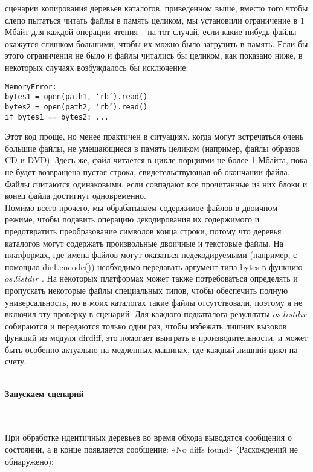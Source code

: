 \documentclass[12pt]{article}
\begin{document}
сценарии копирования деревьев каталогов, приведенном выше,
вместо того чтобы слепо пытаться читать файлы в память целиком, мы
установили ограничение в 1 Мбайт для каждой операции чтения – на
тот случай, если какие-нибудь файлы окажутся слишком большими,
чтобы их можно было загрузить в память. Если бы этого ограничения не было и файлы читались бы целиком, как
показано ниже, в некоторых случаях возбуждалось бы исключение:
\begin{verbatim}
MemoryError:
bytes1 = open(path1, ‘rb’).read()
bytes2 = open(path2, ‘rb’).read()
if bytes1 == bytes2: ...
\end{verbatim}
Этот код проще, но менее практичен в ситуациях, когда могут встречаться очень большие файлы, не умещающиеся в память целиком
(например, файлы образов CD и DVD). Здесь же, файл читается
в цикле порциями не более 1 Мбайта, пока не будет возвращена пустая
строка, свидетельствующая об окончании файла. Файлы считаются
одинаковыми, если совпадают все прочитанные из них блоки и конец
файла достигнут одновременно. \\
Помимо всего прочего, мы обрабатываем содержимое файлов в двоичном режиме, чтобы подавить операцию декодирования их содержимого
и предотвратить преобразование символов конца строки, потому что
деревья каталогов могут содержать произвольные двоичные и текстовые файлы. На платформах,
где имена файлов могут оказаться недекодируемыми (например, с помощью dir1.encode()) необходимо передавать аргумент типа bytes в функцию $os.listdir$ . На некоторых платформах может также потребоваться определять и пропускать некоторые файлы специальных типов,
чтобы обеспечить полную универсальность, но в моих каталогах такие
файлы отсутствовали, поэтому я не включил эту проверку в сценарий. Для
каждого подкаталога результаты $os.listdir$ собираются и передаются только один раз, чтобы избежать лишних вызовов функций из
модуля dirdiff, это помогает выиграть в производительности, и может быть особенно актуально на медленных машинах, где каждый лишний цикл на счету.\\
\\
\begin{large}
\textbf{Запускаем сценарий}
\end{large}
\\
\\
При обработке идентичных деревьев во время обхода выводятся сообщения о состоянии, а в конце появляется сообщение: «No
diffs found» (Расхождений не обнаружено):
\end{document}
